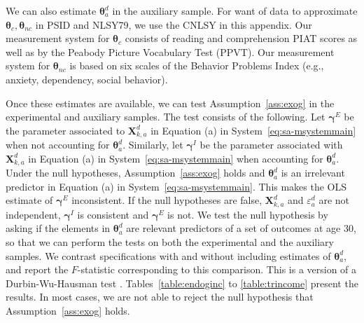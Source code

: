 \noindent We can also estimate $\bm{\theta}_{a}^d$ in the auxiliary sample. For want of data to approximate $\bm{\theta}_{c}, \bm{\theta}_{nc}$ in PSID and NLSY79, we use the CNLSY in this appendix. Our measurement system for $\bm{\theta}_{c}$ consists of reading and comprehension PIAT scores as well as by the Peabody Picture Vocabulary Test (PPVT). Our measurement system for $\bm{\theta}_{nc}$ is based on six scales of the Behavior Problems Index (e.g., anxiety, dependency, social behavior).

\noindent Once these estimates are available, we can test Assumption~\ref{ass:exog} in the experimental and auxiliary samples. The test consists of the following. Let $\bm{\gamma}^E$ be the parameter associated to $\bm{X}^d_{k,a}$ in Equation (a) in System~\eqref{eq:sa-msystemmain} when not accounting for $\bm{\theta}_{a}^d$. Similarly, let $\bm{\gamma}^I$ be the parameter associated with $\bm{X}^d_{k,a}$ in Equation (a) in System~\eqref{eq:sa-msystemmain} when accounting for $\bm{\theta}_{a}^d$. Under the null hypotheses, Assumption~\ref{ass:exog} holds and $\bm{\theta}_{a}^d$ is an irrelevant predictor in Equation (a) in System~\eqref{eq:sa-msystemmain}. This makes the OLS estimate of $\bm{\gamma}^E$ inconsistent. If the null hypotheses are false, $\bm{X}^d_{k,a}$ and $\varepsilon_{a}^d$ are not independent, $\bm{\gamma}^I$ is consistent and $\bm{\gamma}^E$ is not. We test the null hypothesis by asking if the elements in $\bm{\theta}_{a}^d$ are relevant predictors of a set of outcomes at age 30, so that we can perform the tests on both the experimental and the auxiliary samples. We contrast specifications with and without including estimates of $\bm{\theta}_{a}^d$, and report the $F$-statistic corresponding to this comparison. This is a version of a Durbin-Wu-Hausman test \citep[see][]{Durbin_1954_RISI,Wu_1973_Econometrica,Hausman_1978_Econometrica}. Tables~\ref{table:endoginc} to \ref{table:trincome} present the results. In most cases, we are not able to reject the null hypothesis that Assumption~\ref{ass:exog} holds.


